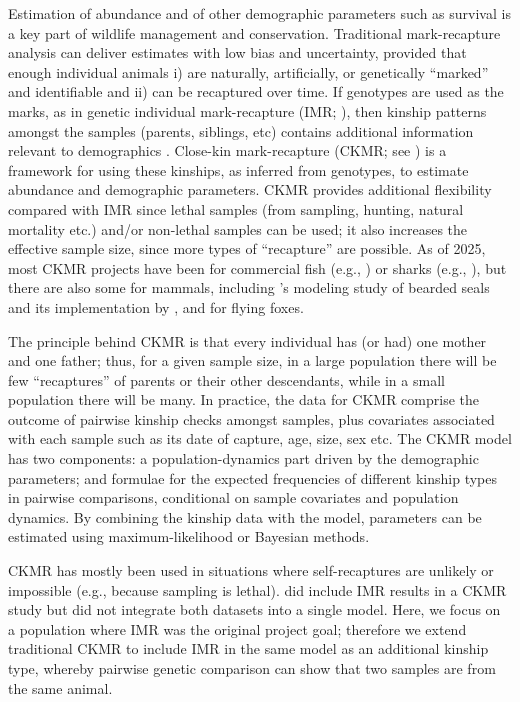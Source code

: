 %

Estimation of abundance and of other demographic parameters such as
survival is a key part of wildlife management and conservation. Traditional
mark-recapture analysis \citep{williams_analysis_2002} can deliver
estimates with low bias and uncertainty, provided that enough individual
animals i) are naturally, artificially, or genetically “marked” and
identifiable and ii) can be recaptured over time. If genotypes are
used as the marks, as in genetic individual mark-recapture (IMR; \citealp{palsboll_genetic_1997}),
then kinship patterns amongst the samples (parents, siblings, etc)
contains additional information relevant to demographics \citep{skaug_allele-sharing_2001}.
Close-kin mark-recapture (CKMR; see \citealp{bravington_close-kin_2016})
is a framework for using these kinships, as inferred from genotypes,
to estimate abundance and demographic parameters. CKMR provides additional
flexibility compared with IMR since lethal samples (from sampling,
hunting, natural mortality etc.) and/or non-lethal samples can be
used; it also increases the effective sample size, since more types
of ``recapture'' are possible. As of 2025, most CKMR projects have
been for commercial fish (e.g., \citealp{Davies2020SBT2}) or sharks
(e.g., \citealp{Hillary2018WS-CKMR}), but there are also some for
mammals, including \citet{conn_robustness_2020}'s modeling study
of bearded seals and its implementation by \citet{taras_estimating_2024},
and \citet{lloyd-jones_close-kin_2023} for flying foxes.

The principle behind CKMR is that every individual has (or had) one
mother and one father; thus, for a given sample size, in a large population
there will be few ``recaptures'' of parents or their other descendants,
while in a small population there will be many. In practice, the data
for CKMR comprise the outcome of pairwise kinship checks amongst samples,
plus covariates associated with each sample such as its date of capture,
age, size, sex etc. The CKMR model has two components: a population-dynamics
part driven by the demographic parameters; and formulae for the expected
frequencies of different kinship types in pairwise comparisons, conditional
on sample covariates and population dynamics. By combining the kinship
data with the model, parameters can be estimated using maximum-likelihood
or Bayesian methods.

CKMR has mostly been used in situations where self-recaptures are
unlikely or impossible (e.g., because sampling is lethal). \citet{lloyd-jones_close-kin_2023}
did include IMR results in a CKMR study but did not integrate both
datasets into a single model. Here, we focus on a population where
IMR was the original project goal; therefore we extend traditional
CKMR to include IMR in the same model as an additional kinship type,
whereby pairwise genetic comparison can show that two samples are
from the same animal.


